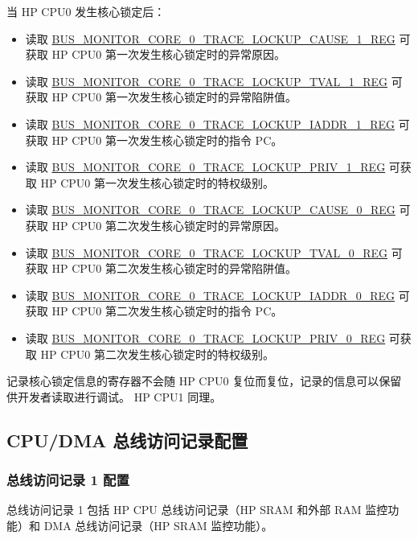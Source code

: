 \documentclass[main\_\_CN.tex]{subfiles}
\begin{document}
当 HP CPU0 发生核心锁定后：
\begin{itemize}
        \item 读取 \hyperref[regdesc:BUSMONITORCORE0TRACELOCKUPCAUSE1REG]{BUS\_MONITOR\_CORE\_0\_TRACE\_LOCKUP\_CAUSE\_1\_REG} 可获取 HP CPU0 第一次发生核心锁定时的异常原因。
        \item 读取 \hyperref[regdesc:BUSMONITORCORE0TRACELOCKUPTVAL1REG]{BUS\_MONITOR\_CORE\_0\_TRACE\_LOCKUP\_TVAL\_1\_REG} 可获取 HP CPU0 第一次发生核心锁定时的异常陷阱值。
        \item 读取 \hyperref[regdesc:BUSMONITORCORE0TRACELOCKUPIADDR1REG]{BUS\_MONITOR\_CORE\_0\_TRACE\_LOCKUP\_IADDR\_1\_REG} 可获取 HP CPU0 第一次发生核心锁定时的指令 PC。
        \item 读取 \hyperref[regdesc:BUSMONITORCORE0TRACELOCKUPPRIV1REG]{BUS\_MONITOR\_CORE\_0\_TRACE\_LOCKUP\_PRIV\_1\_REG} 可获取 HP CPU0 第一次发生核心锁定时的特权级别。

        \item 读取 \hyperref[regdesc:BUSMONITORCORE0TRACELOCKUPCAUSE0REG]{BUS\_MONITOR\_CORE\_0\_TRACE\_LOCKUP\_CAUSE\_0\_REG} 可获取 HP CPU0 第二次发生核心锁定时的异常原因。
        \item 读取 \hyperref[regdesc:BUSMONITORCORE0TRACELOCKUPTVAL0REG]{BUS\_MONITOR\_CORE\_0\_TRACE\_LOCKUP\_TVAL\_0\_REG} 可获取 HP CPU0 第二次发生核心锁定时的异常陷阱值。
        \item 读取 \hyperref[regdesc:BUSMONITORCORE0TRACELOCKUPIADDR0REG]{BUS\_MONITOR\_CORE\_0\_TRACE\_LOCKUP\_IADDR\_0\_REG} 可获取 HP CPU0 第二次发生核心锁定时的指令 PC。
        \item 读取 \hyperref[regdesc:BUSMONITORCORE0TRACELOCKUPPRIV0REG]{BUS\_MONITOR\_CORE\_0\_TRACE\_LOCKUP\_PRIV\_0\_REG} 可获取 HP CPU0 第二次发生核心锁定时的特权级别。        
\end{itemize}

记录核心锁定信息的寄存器不会随 HP CPU0 复位而复位，记录的信息可以保留供开发者读取进行调试。
HP CPU1 同理。

\subsection{CPU/DMA 总线访问记录配置}

\subsubsection{总线访问记录 1 配置}
\label{sec:hp-cpu-access-mon}

总线访问记录 1 包括 HP CPU 总线访问记录（HP SRAM 和外部 RAM 监控功能）和 DMA 总线访问记录（HP SRAM 监控功能）。
\end{document}
